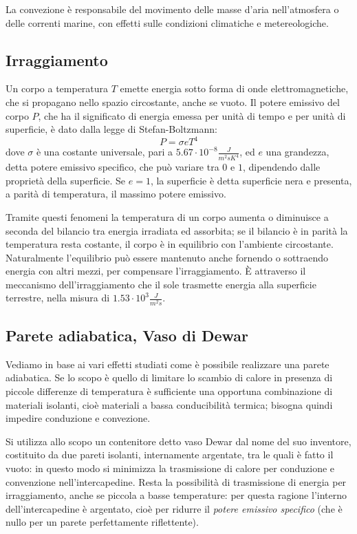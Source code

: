\documentclass[class=book, crop=false, oneside, 12pt]{standalone}
\begin{document}
La convezione è responsabile del movimento delle masse d'aria nell'atmosfera o delle correnti marine, con effetti sulle condizioni climatiche e metereologiche.

\subsection{Irraggiamento}

Un corpo a temperatura \(T\) emette energia sotto forma di onde elettromagnetiche, che si propagano nello spazio circostante, anche se vuoto. 
Il potere emissivo del corpo \(P\), che ha il significato di energia emessa per unità di tempo e per unità di superficie, è dato dalla legge di Stefan-Boltzmann: 
\begin{equation}
    P = \sigma e T^{4}
\end{equation}
dove \(\sigma\) è una costante universale, pari a  \(5.67 \cdot 10^{-8} \frac{J}{m^2 s K^4}\), ed \(e\) una grandezza, detta potere emissivo specifico, che può variare tra \(0\) e \(1\), dipendendo dalle proprietà della superficie. 
Se \(e = 1\), la superficie è detta superficie nera e presenta, a parità di temperatura, il massimo potere emissivo. 

Tramite questi fenomeni la temperatura di un corpo aumenta o diminuisce a seconda del bilancio tra energia irradiata ed assorbita; se il bilancio è in parità la temperatura resta costante, il corpo è in equilibrio con l'ambiente circostante. 
Naturalmente l'equilibrio può essere mantenuto anche fornendo o sottraendo energia con altri mezzi, per compensare l'irraggiamento. 
È attraverso il meccanismo dell'irraggiamento che il sole trasmette energia alla superficie terrestre, nella misura di \(1.53 \cdot 10^3 \frac{J}{m^2 s}\).

\subsection{Parete adiabatica, Vaso di Dewar}

Vediamo in base ai vari effetti studiati come è possibile realizzare una parete adiabatica. 
Se lo scopo è quello di limitare lo scambio di calore in presenza di piccole differenze di temperatura è sufficiente una opportuna combinazione di materiali isolanti, cioè materiali a bassa conducibilità termica; bisogna quindi impedire conduzione e convezione. 

Si utilizza allo scopo un contenitore detto vaso Dewar dal nome del suo inventore, costituito da due pareti isolanti, internamente argentate, tra le quali è fatto il vuoto: in questo modo si minimizza la trasmissione di calore per conduzione e convenzione nell'intercapedine. 
Resta la possibilità di trasmissione di energia per irraggiamento, anche se piccola a basse temperature: per questa ragione l'interno dell'intercapedine è argentato, cioè per ridurre il \emph{potere emissivo specifico} (che è nullo per un parete perfettamente riflettente). 
\end{document}
